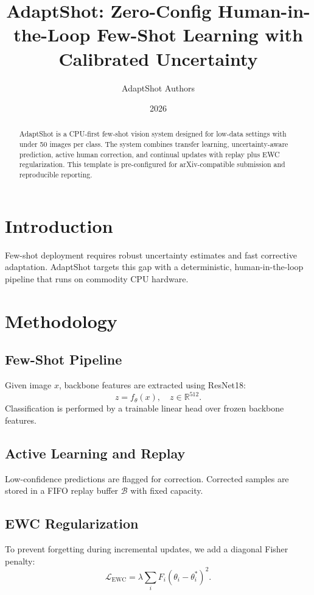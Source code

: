 \documentclass[11pt]{article}
\title{AdaptShot: Zero-Config Human-in-the-Loop Few-Shot Learning with Calibrated Uncertainty}
\author{AdaptShot Authors}
\date{2026}
\begin{document}
\maketitle

\begin{abstract}
AdaptShot is a CPU-first few-shot vision system designed for low-data settings with under 50 images per class. The system combines transfer learning, uncertainty-aware prediction, active human correction, and continual updates with replay plus EWC regularization. This template is pre-configured for arXiv-compatible submission and reproducible reporting.
\end{abstract}

\section{Introduction}
Few-shot deployment requires robust uncertainty estimates and fast corrective adaptation. AdaptShot targets this gap with a deterministic, human-in-the-loop pipeline that runs on commodity CPU hardware.

\section{Methodology}
\subsection{Few-Shot Pipeline}
Given image $x$, backbone features are extracted using ResNet18:
\begin{equation}
z = f_{\theta}(x), \quad z \in \mathbb{R}^{512}.
\end{equation}
Classification is performed by a trainable linear head over frozen backbone features.

\subsection{Active Learning and Replay}
Low-confidence predictions are flagged for correction. Corrected samples are stored in a FIFO replay buffer $\mathcal{B}$ with fixed capacity.

\subsection{EWC Regularization}
To prevent forgetting during incremental updates, we add a diagonal Fisher penalty:
\begin{equation}
\mathcal{L}_{\text{EWC}} = \lambda \sum_i F_i(\theta_i - \theta_i^*)^2.
\end{equation}
\end{document}
